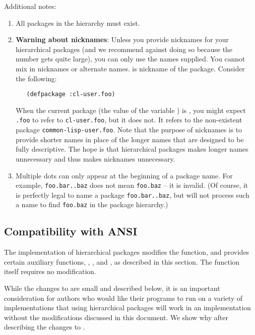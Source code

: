 Additional notes:

\begin{enumerate}
\item
All packages in the hierarchy must exist.

\item
\textbf{Warning about nicknames}: Unless you provide nicknames for
your hierarchical packages (and we recommend against doing so because
the number gets quite large), you can only use the names supplied. You
cannot mix in nicknames or alternate names. 
is nickname of the  package.
Consider the following:

\begin{verbatim}
   (defpackage :cl-user.foo)
\end{verbatim}
  
When the current package (the value of the variable )
is , you might expect \verb|.foo| to refer to
\verb|cl-user.foo|, but it does not. It refers to the non-existent
package \verb|common-lisp-user.foo|. Note that the purpose of
nicknames is to provide shorter names in place of the longer names
that are designed to be fully descriptive. The hope is that
hierarchical packages makes longer names unnecessary and thus makes
nicknames unnecessary.

\item
Multiple dots can only appear at the beginning of a package name. For
example, \verb|foo.bar..baz| does not mean \verb|foo.baz| -- it is
invalid. (Of course, it is perfectly legal to name a package
\verb|foo.bar..baz|, but  will not process such
a name to find \verb|foo.baz| in the package hierarchy.)
\end{enumerate}


\subsection{Compatibility with ANSI \clisp{}}

The implementation of hierarchical packages modifies the
 function, and provides certain auxiliary
functions, , , and
, as described in this section.
The function  itself requires no modification.

While the changes to  are small and described
below, it is an important consideration for authors who would like
their programs to run on a variety of implementations that using
hierarchical packages will work in an implementation without the
modifications discussed in this document. We show why after
describing the changes to .

